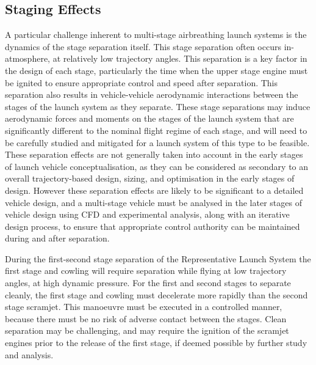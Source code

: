 \subsection{Staging Effects}\label{sec:stagingSimp}
A particular challenge inherent to multi-stage airbreathing launch systems is the dynamics of the stage separation itself. This stage separation often occurs in-atmosphere, at relatively low trajectory angles. This separation is a key factor in the design of each stage, particularly the time when the upper stage engine must be ignited to ensure appropriate control and speed after separation. This separation also results in vehicle-vehicle aerodynamic interactions between the stages of the launch system as they separate. These stage separations may induce aerodynamic forces and moments on the stages of the launch system that are significantly different to the nominal flight regime of each stage, and will need to be carefully studied and mitigated for a launch system of this type to be feasible\cite{mochammad,Kudo2005}. 
These separation effects are not generally taken into account in the early stages of launch vehicle conceptualisation, as they can be considered as secondary to an overall trajectory-based design, sizing, and optimisation in the early stages of design.  
However these separation effects are likely to be significant to a detailed vehicle design, and a multi-stage vehicle must be analysed in the later stages of vehicle design using CFD and experimental analysis, along with an iterative design process, to ensure that appropriate control authority can be maintained during and after separation\cite{mochammad}.  

During the first-second stage separation of the Representative Launch System the first stage and cowling will require separation while flying at low trajectory angles, at high dynamic pressure. For the first and second stages to separate cleanly, the first stage and cowling must decelerate more rapidly than the second stage scramjet. This manoeuvre must be executed in a controlled manner, because there must be no risk of adverse contact between the stages. Clean separation may be challenging, and may require the ignition of the scramjet engines prior to the release of the first stage, if deemed possible by further study and analysis. 

